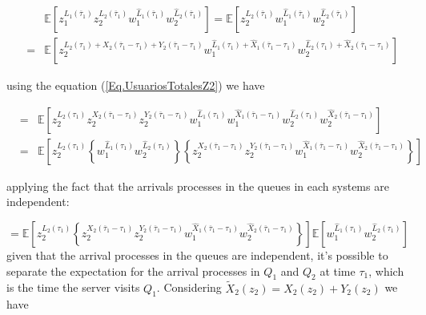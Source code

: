 \documentclass{article}
\newcommand{\esp}{\mathbb{E}}
\begin{document}
\begin{eqnarray*}
&&\esp\left[z_{1}^{L_{1}\left(\overline{\tau}_{1}\right)}z_{2}^{L_{2}\left(\overline{\tau}_{1}\right)}w_{1}^{\hat{L}_{1}\left(\overline{\tau}_{1}\right)}w_{2}^{\hat{L}_{2}\left(\overline{\tau}_{1}\right)}\right]
=\esp\left[z_{2}^{L_{2}\left(\overline{\tau}_{1}\right)}w_{1}^{\hat{L}_{1}\left(\overline{\tau}_{1}
\right)}w_{2}^{\hat{L}_{2}\left(\overline{\tau}_{1}\right)}\right]\\
&=&\esp\left[z_{2}^{L_{2}\left(\tau_{1}\right)+X_{2}\left(\overline{\tau}_{1}-\tau_{1}\right)+Y_{2}\left(\overline{\tau}_{1}-\tau_{1}\right)}w_{1}^{\hat{L}_{1}\left(\tau_{1}\right)+\hat{X}_{1}\left(\overline{\tau}_{1}-\tau_{1}\right)}w_{2}^{\hat{L}_{2}\left(\tau_{1}\right)+\hat{X}_{2}\left(\overline{\tau}_{1}-\tau_{1}\right)}\right]
\end{eqnarray*}

using the equation (\ref{Eq.UsuariosTotalesZ2}) we have


\begin{eqnarray*}
&=&\esp\left[z_{2}^{L_{2}\left(\tau_{1}\right)}z_{2}^{X_{2}\left(\overline{\tau}_{1}-\tau_{1}\right)}z_{2}^{Y_{2}\left(\overline{\tau}_{1}-\tau_{1}\right)}w_{1}^{\hat{L}_{1}\left(\tau_{1}\right)}w_{1}^{\hat{X}_{1}\left(\overline{\tau}_{1}-\tau_{1}\right)}w_{2}^{\hat{L}_{2}\left(\tau_{1}\right)}w_{2}^{\hat{X}_{2}\left(\overline{\tau}_{1}-\tau_{1}\right)}\right]\\
&=&\esp\left[z_{2}^{L_{2}\left(\tau_{1}\right)}\left\{w_{1}^{\hat{L}_{1}\left(\tau_{1}\right)}w_{2}^{\hat{L}_{2}\left(\tau_{1}\right)}\right\}\left\{z_{2}^{X_{2}\left(\overline{\tau}_{1}-\tau_{1}\right)}
z_{2}^{Y_{2}\left(\overline{\tau}_{1}-\tau_{1}\right)}w_{1}^{\hat{X}_{1}\left(\overline{\tau}_{1}-\tau_{1}\right)}w_{2}^{\hat{X}_{2}\left(\overline{\tau}_{1}-\tau_{1}\right)}\right\}\right]
\end{eqnarray*}

applying the fact that the arrivals processes in the queues in each systems are independent:

$$=\esp\left[z_{2}^{L_{2}\left(\tau_{1}\right)}\left\{z_{2}^{X_{2}\left(\overline{\tau}_{1}-\tau_{1}\right)}z_{2}^{Y_{2}\left(\overline{\tau}_{1}-
\tau_{1}\right)}w_{1}^{\hat{X}_{1}\left(\overline{\tau}_{1}-\tau_{1}\right)}w_{2}^{\hat{X}_{2}\left(\overline{\tau}_{1}-\tau_{1}\right)}\right\}\right]
\esp\left[w_{1}^{\hat{L}_{1}\left(\tau_{1}\right)}w_{2}^{\hat{L}_{2}\left(\tau_{1}\right)}\right]$$ given that the arrival processes in the queues are independent, it's possible to separate the expectation for the arrival processes in $Q_{1}$ and $Q_{2}$ at time $\tau_{1}$, which is the time the server visits $Q_{1}$. Considering
$\tilde{X}_{2}\left(z_{2}\right)=X_{2}\left(z_{2}\right)+Y_{2}\left(z_{2}\right)$ we have
\end{document}
